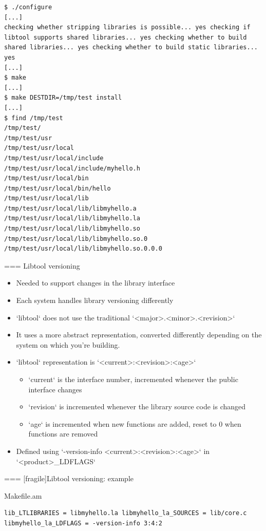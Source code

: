 \begin{block}{}
\begin{verbatim}
$ ./configure
[...]
checking whether stripping libraries is possible... yes checking if libtool supports shared libraries... yes checking whether to build shared libraries... yes checking whether to build static libraries... yes
[...]
$ make
[...]
$ make DESTDIR=/tmp/test install
[...]
$ find /tmp/test
/tmp/test/
/tmp/test/usr
/tmp/test/usr/local
/tmp/test/usr/local/include
/tmp/test/usr/local/include/myhello.h
/tmp/test/usr/local/bin
/tmp/test/usr/local/bin/hello
/tmp/test/usr/local/lib
/tmp/test/usr/local/lib/libmyhello.a
/tmp/test/usr/local/lib/libmyhello.la
/tmp/test/usr/local/lib/libmyhello.so
/tmp/test/usr/local/lib/libmyhello.so.0
/tmp/test/usr/local/lib/libmyhello.so.0.0.0
\end{verbatim}
\end{block}



=== {Libtool versioning}
  \begin{itemize}
  \item Needed to support changes in the library interface
  \item Each system handles library versioning differently
  \item `libtool` does not use the traditional
    `<major>.<minor>.<revision>`
  \item It uses a more abstract representation, converted differently
    depending on the system on which you're building.
  \item `libtool` representation is
    `<current>:<revision>:<age>`
    \begin{itemize}
    \item `current` is the interface number, incremented whenever
      the public interface changes
    \item `revision` is incremented whenever the library source
      code is changed
    \item `age` is incremented when new functions are added,
      reset to 0 when functions are removed
    \end{itemize}
  \item Defined using `-version-info <current>:<revision>:<age>`
    in `<product>_LDFLAGS`
  \end{itemize}


=== [fragile]{Libtool versioning: example}

\begin{block}{Makefile.am}
\begin{verbatim}
lib_LTLIBRARIES = libmyhello.la libmyhello_la_SOURCES = lib/core.c libmyhello_la_LDFLAGS = -version-info 3:4:2
\end{verbatim}
\end{block}

